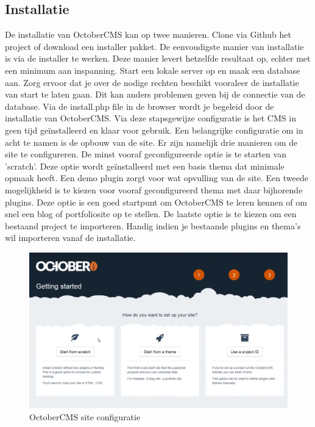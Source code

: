 \subsection{Installatie}
De installatie van OctoberCMS kan op twee manieren. Clone via Github het project of download een installer pakket. De eenvoudigste manier van installatie is via de installer te werken. Deze manier levert hetzelfde resultaat op, echter met een minimum aan inspanning. Start een lokale server op en maak een database aan. Zorg ervoor dat je over de nodige rechten beschikt vooraleer de installatie van start te laten gaan. Dit kan anders problemen geven bij de connectie van de database. Via de install.php file in de browser wordt je begeleid door de installatie van OctoberCMS. Via deze stapsgewijze configuratie is het CMS in geen tijd geïnstalleerd en klaar voor gebruik. 
\newline\newline
Een belangrijke configuratie om in acht te namen is de opbouw van de site. Er zijn namelijk drie manieren om de site te configureren. De minst vooraf geconfigureerde optie is te starten van 'scratch'. Deze optie wordt geïnstalleerd met een basis thema dat minimale opmaak heeft. Een demo plugin zorgt voor wat opvulling van de site. Een tweede mogelijkheid is te kiezen voor vooraf geconfigureerd thema met daar bijhorende plugins. Deze optie is een goed startpunt om OctoberCMS te leren kennen of om snel een blog of portfoliosite op te stellen. De laatste optie is te kiezen om een bestaand project te importeren. Handig indien je bestaande plugins en thema's wil importeren vanaf de installatie.

\begin{figure}[!ht]
  \includegraphics[width=120mm]{img/octobercms-configuration.png}
  \centering
  \caption{OctoberCMS site configuratie}
  \label{fig:OctoberCMS site configuratie}
\end{figure}

